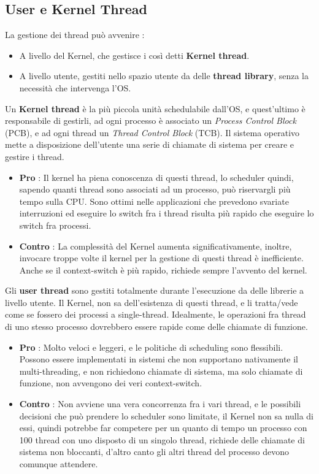 \documentclass[12pt, letterpaper]{article}
\begin{document}
\subsection{User e Kernel Thread}
La gestione dei thread può avvenire :\begin{itemize}
    \item A livello del Kernel, che gestisce i così detti \textbf{Kernel thread}.
    \item A livello utente, gestiti nello spazio utente da delle \textbf{thread library}, senza la necessità che intervenga l'OS.
\end{itemize} 
Un \textbf{Kernel thread} è la più piccola unità schedulabile dall'OS, e quest'ultimo è responsabile di gestirli, ad 
ogni processo è associato un \textit{Process Control Block} (PCB), e ad ogni thread un \textit{Thread Control Block} (TCB). 
Il sistema operativo mette a disposizione dell'utente una serie di chiamate di sistema per creare e gestire i thread.\begin{itemize}
    \item \textbf{Pro} : Il kernel ha piena conoscenza di questi thread, lo scheduler quindi, sapendo quanti thread sono associati 
    ad un processo, può riservargli più tempo sulla CPU. Sono ottimi nelle applicazioni che prevedono svariate interruzioni 
    ed eseguire lo switch fra i thread risulta più rapido che eseguire lo switch fra processi. 
    \item \textbf{Contro} : La complessità del Kernel aumenta significativamente, inoltre, invocare troppe 
    volte il kernel per 
    la gestione di questi thread è inefficiente. Anche se il context-switch è più rapido, richiede sempre l'avvento del 
    kernel.
\end{itemize}
Gli \textbf{user thread} sono gestiti totalmente durante l'esecuzione da delle librerie a livello utente. Il Kernel, non 
sa dell'esistenza di questi thread, e li tratta/vede come se fossero dei processi a single-thread. Idealmente, le operazioni fra 
thread di uno stesso processo dovrebbero essere rapide come delle chiamate di funzione.\begin{itemize}
    \item \textbf{Pro} : Molto veloci e leggeri, e le politiche di scheduling sono flessibili. Possono essere 
    implementati in sistemi che non supportano nativamente il multi-threading, e non richiedono chiamate di sistema, ma 
    solo chiamate di funzione, non avvengono dei veri context-switch. 
    \item \textbf{Contro} : Non avviene una vera concorrenza fra i vari thread, e le possibili decisioni che può 
    prendere lo scheduler sono limitate, il Kernel non sa nulla di essi, quindi potrebbe far competere per un quanto 
    di tempo un processo con 100 thread con uno disposto di un singolo thread, richiede delle chiamate di sistema non 
    bloccanti, d'altro canto gli altri thread del processo devono comunque attendere.
\end{itemize}
\end{document}

